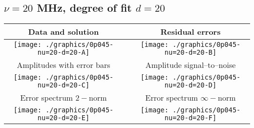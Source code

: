 

% 

\clearpage{}
\break{}

\subsection{$\nu = 20$ MHz, degree of fit $d = 20$}

\begin{table}[h]
    \begin{center}
        \begin{tabular}{ccc}
            Data and solution & \quad & Residual errors \\\hline
            \texttt{[image: ./graphics/0p045-nu=20-d=20-A]} &&
            \texttt{[image: ./graphics/0p045-nu=20-d=20-B]} \\[15pt]
            Amplitudes with error bars && Amplitude signal--to--noise \\\hline
            \texttt{[image: ./graphics/0p045-nu=20-d=20-C]} &&
            \texttt{[image: ./graphics/0p045-nu=20-d=20-D]} \\[15pt]
            Error spectrum $2-$norm && Error spectrum $\infty-$norm \\\hline
            \texttt{[image: ./graphics/0p045-nu=20-d=20-E]} &&
            \texttt{[image: ./graphics/0p045-nu=20-d=20-F]} \\[15pt]
        \end{tabular}
    \end{center}
\label{fig:elev=45, nu=20}
\end{table}



\endinput
